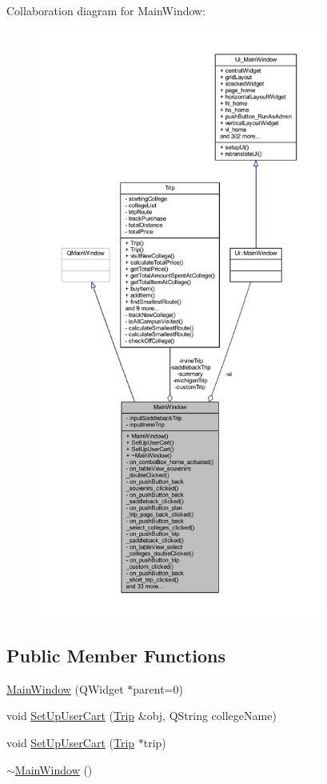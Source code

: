 Collaboration diagram for Main\+Window\+:
\nopagebreak
\begin{figure}[H]
\begin{center}
\leavevmode
\includegraphics[height=550pt]{class_main_window__coll__graph}
\end{center}
\end{figure}
\subsection*{Public Member Functions}
\begin{DoxyCompactItemize}
\item 
\hyperlink{class_main_window_a8b244be8b7b7db1b08de2a2acb9409db}{Main\+Window} (Q\+Widget $\ast$parent=0)
\item 
void \hyperlink{class_main_window_af2cf9ae1dfdb33e7e5239f577d6a4420}{Set\+Up\+User\+Cart} (\hyperlink{class_trip}{Trip} \&obj, Q\+String college\+Name)
\item 
void \hyperlink{class_main_window_ae9807d76e3d34097b05e94c5053c18e9}{Set\+Up\+User\+Cart} (\hyperlink{class_trip}{Trip} $\ast$trip)
\item 
\hyperlink{class_main_window_ae98d00a93bc118200eeef9f9bba1dba7}{$\sim$\+Main\+Window} ()
\end{DoxyCompactItemize}
